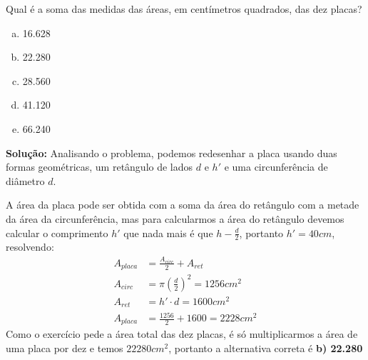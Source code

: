 \begin{multicols*}{2}
    \noindent
    Qual é a soma das medidas das áreas, em centímetros quadrados, das dez placas?
    \begin{enumerate}[(a)]
        \item 16.628
        \item 22.280
        \item 28.560
        \item 41.120
        \item 66.240
    \end{enumerate}

    \noindent \textbf{Solução:}
    Analisando o problema, podemos redesenhar a placa usando duas formas
    geométricas, um retângulo de lados $d$ e $h'$ e uma circunferência de 
    diâmetro $d$.
    \begin{figure}[H]
    \centering
    \end{figure}

    \noindent A área da placa pode ser obtida com a soma da área do retângulo 
    com a metade da área da circunferência, mas para calcularmos a área do 
    retângulo devemos calcular o comprimento $h'$ que nada mais é que $h-\frac{d}{2}$, 
    portanto $h' = 40cm$, resolvendo:
    \begin{align}
        A_{placa} &= \frac{A_{circ}}{2} + A_{ret}\\[1ex]
        A_{circ} &= \pi\left( \frac{d}{2} \right)^2 = 1256cm^2\\
        A_{ret} &= h'\cdot d = 1600cm^2 \\
        A_{placa} &= \frac{1256}{2} + 1600 = 2228 cm^2
    \end{align}
    \noindent Como o exercício pede a área total das dez placas, é só 
    multiplicarmos a área de uma placa por dez e temos $22280cm^2$, portanto a 
    alternativa correta é \textbf{b) 22.280}\\


\end{multicols*}
